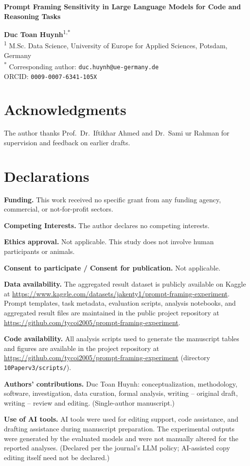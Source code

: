 \documentclass[11pt]{article}
\begin{document}
\begin{center}
{\Large\bfseries Prompt Framing Sensitivity in Large Language Models for Code and Reasoning Tasks}
\end{center}

\vspace{1em}

\textbf{Duc Toan Huynh}\textsuperscript{1,*}\\[0.3em]
\textsuperscript{1} M.Sc. Data Science, University of Europe for Applied Sciences, Potsdam, Germany\\[0.3em]
\textsuperscript{*} Corresponding author: \texttt{duc.huynh@ue-germany.de}\\
ORCID: \texttt{0009-0007-6341-105X}

\section*{Acknowledgments}
The author thanks Prof.~Dr.~Iftikhar Ahmed and Dr.~Sami ur Rahman for supervision and feedback on earlier drafts.

\section*{Declarations}

\textbf{Funding.} This work received no specific grant from any funding agency, commercial, or not-for-profit sectors.

\textbf{Competing Interests.} The author declares no competing interests.

\textbf{Ethics approval.} Not applicable. This study does not involve human participants or animals.

\textbf{Consent to participate / Consent for publication.} Not applicable.

\textbf{Data availability.} The aggregated result dataset is publicly available on Kaggle at \url{https://www.kaggle.com/datasets/jakenty1/prompt-framing-experiment}. Prompt templates, task metadata, evaluation scripts, analysis notebooks, and aggregated result files are maintained in the public project repository at \url{https://github.com/tycoi2005/prompt-framing-experiment}.

\textbf{Code availability.} All analysis scripts used to generate the manuscript tables and figures are available in the project repository at \url{https://github.com/tycoi2005/prompt-framing-experiment} (directory \texttt{10Paperv3/scripts/}).

\textbf{Authors' contributions.} Duc Toan Huynh: conceptualization, methodology, software, investigation, data curation, formal analysis, writing -- original draft, writing -- review and editing. (Single-author manuscript.)

\textbf{Use of AI tools.} AI tools were used for editing support, code assistance, and drafting assistance during manuscript preparation. The experimental outputs were generated by the evaluated models and were not manually altered for the reported analyses. (Declared per the journal's LLM policy; AI-assisted copy editing itself need not be declared.)
\end{document}
